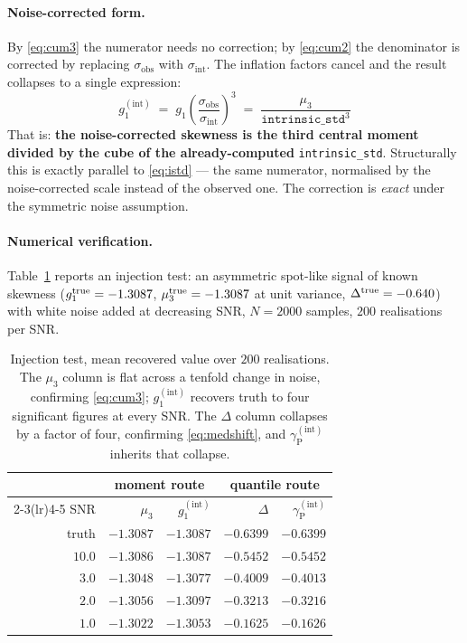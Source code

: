 \documentclass[11pt]{article}
\newcommand{\istd}{\texttt{intrinsic\_std}}
\newcommand{\gp}{\gamma_{\mathrm{P}}}
\newcommand{\sigobs}{\sigma_{\mathrm{obs}}}
\newcommand{\sigint}{\sigma_{\mathrm{int}}}
\begin{document}
\paragraph{Noise-corrected form.} By \eqref{eq:cum3} the numerator needs no
correction; by \eqref{eq:cum2} the denominator is corrected by replacing
$\sigobs$ with $\sigint$. The inflation factors cancel and the result collapses
to a single expression:
%
\begin{equation}
  \boxed{\;g_1^{\mathrm{(int)}}
     \;=\; g_1 \left(\frac{\sigobs}{\sigint}\right)^{3}
     \;=\; \frac{\mu_3}{\istd^{3}}\;}
  \label{eq:g1int}
\end{equation}
%
That is: \textbf{the noise-corrected skewness is the third central moment divided
by the cube of the already-computed} \istd. Structurally this is exactly parallel
to \eqref{eq:istd} --- the same numerator, normalised by the noise-corrected scale
instead of the observed one. The correction is \emph{exact} under the symmetric
noise assumption.

\paragraph{Numerical verification.} Table~\ref{tab:injection} reports an
injection test: an asymmetric spot-like signal of known skewness
($g_1^{\rm true} = -1.3087$, $\mu_3^{\rm true} = -1.3087$ at unit variance,
$\Delta^{\rm true} = -0.640$) with white noise added at decreasing SNR,
$N = 2000$ samples, $200$ realisations per SNR.

\begin{table}[htbp]
\centering
\caption{Injection test, mean recovered value over $200$ realisations. The
$\mu_3$ column is flat across a tenfold change in noise, confirming
\eqref{eq:cum3}; $g_1^{\mathrm{(int)}}$ recovers truth to four significant
figures at every SNR. The $\Delta$ column collapses by a factor of four,
confirming \eqref{eq:medshift}, and $\gp^{\mathrm{(int)}}$ inherits that
collapse.}
\label{tab:injection}
\begin{tabular}{r rr rr}
\toprule
 & \multicolumn{2}{c}{moment route} & \multicolumn{2}{c}{quantile route} \\
\cmidrule(lr){2-3}\cmidrule(lr){4-5}
SNR & $\mu_3$ & $g_1^{\mathrm{(int)}}$ & $\Delta$ & $\gp^{\mathrm{(int)}}$ \\
\midrule
truth   & $-1.3087$ & $-1.3087$ & $-0.6399$ & $-0.6399$ \\
\midrule
$10.0$  & $-1.3086$ & $-1.3087$ & $-0.5452$ & $-0.5452$ \\
$3.0$   & $-1.3048$ & $-1.3077$ & $-0.4009$ & $-0.4013$ \\
$2.0$   & $-1.3056$ & $-1.3097$ & $-0.3213$ & $-0.3216$ \\
$1.0$   & $-1.3022$ & $-1.3053$ & $-0.1625$ & $-0.1626$ \\
\bottomrule
\end{tabular}
\end{table}
\end{document}

